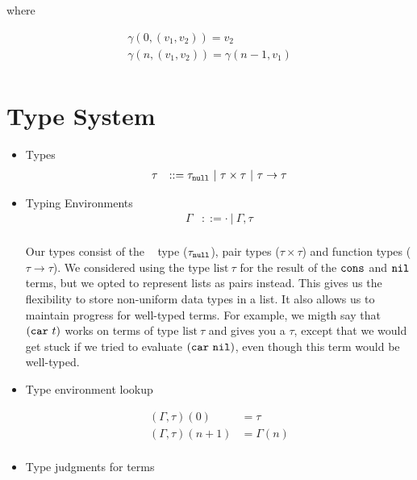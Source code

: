 \documentclass{article}
\begin{document}
where

\[
\begin{array}{rlr}
\gamma(0, (v_1, v_2)) = v_2 \\
\gamma(n, (v_1, v_2)) = \gamma(n-1, v_1)\\
\end{array}
\]


\section{Type System}

\begin{itemize}

\item Types
\[
\begin{array}{rlr}
  \tau & ::= \tau_\vnull ~|~ \tau \times \tau ~|~ \tau \rightarrow \tau \\  
\end{array}
\]


\item Typing Environments
\[
\begin{array}{rlr}
  \Gamma & ::= \cdot ~|~ \Gamma, \tau \\
\end{array}
\]

Our types consist of the \vnull~ type ($\tau_\vnull$), pair types ($\tau
\times \tau$) and function types ($\tau \rightarrow \tau$). We
considered using the type $\mathrm{list}~\tau$ for the result of the
$\cons$ and $\nil$ terms, but we opted to represent lists as pairs
instead. This gives us the flexibility to store non-uniform data types
in a list. It also allows us to maintain progress for well-typed
terms. For example, we migth say that $(\car~t)$ works on terms of
type $\mathrm{list}~\tau$ and gives you a $\tau$, except that we would
get stuck if we tried to evaluate $(\car~\nil)$, even though this term
would be well-typed.

\item Type environment lookup

\[
\begin{array}{rl}
  (\Gamma, \tau)(0) & = \tau \\
  (\Gamma, \tau)(n + 1) & = \Gamma(n) \\
\end{array}
\]

\item Type judgments for terms

\begin{mathpar}


\end{mathpar}
\end{itemize}
\end{document}
